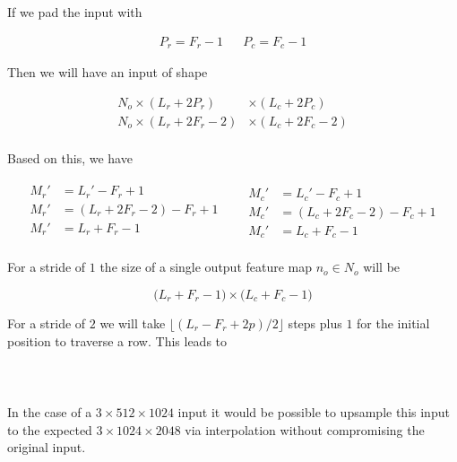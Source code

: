 \documentclass[12pt]{article}
\begin{document}
If we pad the input with

\begin{align}
	P_r = F_r - 1 && P_c = F_c - 1
\end{align}

Then we will have an input of shape

\begin{align}
	N_o \times (L_r + 2 P_r) \phantom{-2} &\times (L_c + 2 P_c)\\
	N_o \times (L_r + 2 F_r - 2) &\times (L_c + 2 F_c - 2)\\
\end{align}

Based on this, we have

\begin{align}
	\begin{aligned}
		M_r' &= L_r' - F_r + 1 \\
		M_r' &= (L_r+2F_r-2) - F_r + 1\\
		M_r' &= L_r+F_r - 1 \\
	\end{aligned}
	&&
	\begin{aligned}
		M_c' &= L_c' - F_c + 1 \\
		M_c' &= (L_c+2F_c-2) - F_c + 1 \\
		M_c' &= L_c+F_c - 1
	\end{aligned}
\end{align}

For a stride of $1$ the size of a single output feature map $n_o \in N_o$ will
be

\begin{equation}
	\big(L_r+F_r-1\big)\times\big(L_c+F_c-1\big)
\end{equation}

For a stride of $2$ we will take $\lfloor (L_r - F_r + 2p)/2 \rfloor$ steps plus $1$ for
the initial position to traverse a row. This leads to

\begin{align}
\end{align}

\section{}

In the case of a $3 \times 512 \times 1024$ input it would be possible to
upsample this input to the expected $3 \times 1024 \times 2048$ via
interpolation without compromising the original input.
\newline
\end{document}
